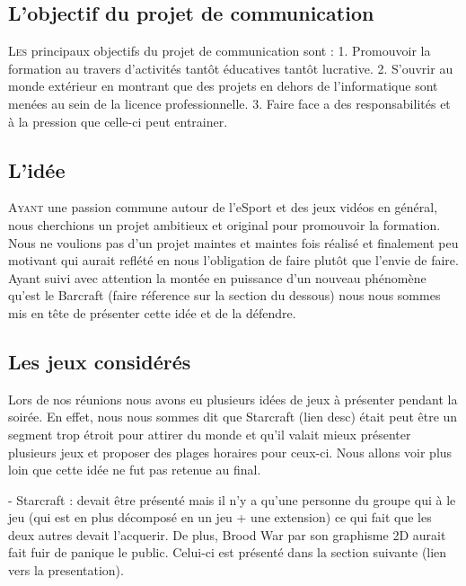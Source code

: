 \subsection{L'objectif du projet de communication}%
\label{sub:l_objectif_du_projet_de_communication}

\lettrine{L}{es} principaux objectifs du projet de communication sont :
1. Promouvoir la formation au travers d'activités tantôt éducatives
tantôt lucrative.  2. S'ouvrir au monde extérieur en montrant que des
projets en dehors de l'informatique sont menées au sein de la licence
professionnelle.  3.  Faire face a des responsabilités et à la pression
que celle-ci peut entrainer.

\subsection{L'idée}%
\label{sub:l_idee}

\lettrine{A}{yant} une passion commune autour de l'eSport et des jeux
vidéos en général, nous cherchions un projet ambitieux et original
pour promouvoir la formation. Nous ne voulions pas d'un projet maintes
et maintes fois réalisé et finalement peu motivant qui aurait
reflété en nous l'obligation de faire plutôt que l'envie de faire.
Ayant suivi avec attention la montée en puissance d'un nouveau
phénomène qu'est le Barcraft (faire réference sur la section du
dessous) nous nous sommes mis en tête de présenter cette idée et de la
défendre.

\subsection{Les jeux considérés}%
\label{sub:les_jeux_consideres}

Lors de nos réunions nous avons eu plusieurs idées de jeux à présenter
pendant la soirée. En effet, nous nous sommes dit que Starcraft (lien
desc) était peut être un segment trop étroit pour attirer du monde et
qu'il valait mieux présenter plusieurs jeux et proposer des plages
horaires pour ceux-ci. Nous allons voir plus loin que cette idée ne fut
pas retenue au final.

- Starcraft : devait être présenté mais il n'y a qu'une personne du
groupe qui à le jeu (qui est en plus décomposé en un jeu + une
extension) ce qui fait que les deux autres devait l'acquerir. De
plus, Brood War par son graphisme 2D aurait fait fuir de panique le
public. Celui-ci est présenté dans la section suivante (lien vers la
presentation).

